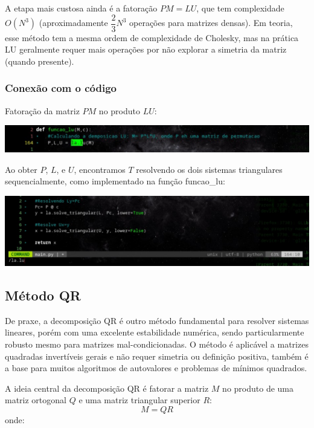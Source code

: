 \documentclass{article}
\begin{document}
    A etapa mais custosa ainda é a fatoração $PM = LU$, que tem complexidade $O(N^3)$ (aproximadamente $\dfrac{2}{3}N^3$ operações para matrizes densas). Em teoria, esse método tem a mesma ordem de complexidade de Cholesky, mas na prática LU geralmente requer mais operações por não explorar a simetria da matriz (quando presente).

    \subsubsection{Conexão com o código}

    Fatoração da matriz $PM$ no produto $LU$:

    \begin{center}
    \includegraphics[width=0.8\linewidth]{imgs/lu_1.png}
    \end{center}

    Ao obter $P$, $L$, e $U$, encontramos $T$ resolvendo os dois sistemas triangulares sequencialmente, como implementado na função funcao\_lu:

    \begin{center}
    \includegraphics[width=0.8\linewidth]{imgs/lu_2.png}
    \end{center}

    \subsection{Método QR}

    De praxe, a decomposição QR é outro método fundamental para resolver sistemas lineares, porém com uma excelente estabilidade numérica, sendo particularmente robusto mesmo para matrizes mal-condicionadas. O método é aplicável a matrizes quadradas invertíveis gerais e não requer simetria ou definição positiva, também é a base para muitos algoritmos de autovalores e problemas de mínimos quadrados.

    A ideia central da decomposição QR é fatorar a matriz $M$ no produto de uma matriz ortogonal $Q$ e uma matriz triangular superior $R$:
    \[ M = QR \]
    onde:
\end{document}
